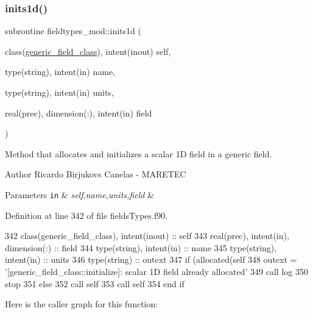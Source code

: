\subsubsection{\texorpdfstring{inits1d()}{inits1d()}}
{\footnotesize\ttfamily subroutine fieldtypes\+\_\+mod\+::inits1d (\begin{DoxyParamCaption}\item[{class(\mbox{\hyperlink{structfieldtypes__mod_1_1generic__field__class}{generic\+\_\+field\+\_\+class}}), intent(inout)}]{self,  }\item[{type(string), intent(in)}]{name,  }\item[{type(string), intent(in)}]{units,  }\item[{real(prec), dimension(\+:), intent(in)}]{field }\end{DoxyParamCaption})\hspace{0.3cm}{\ttfamily [private]}}



Method that allocates and initializes a scalar 1D field in a generic field. 

\begin{DoxyAuthor}{Author}
Ricardo Birjukovs Canelas -\/ M\+A\+R\+E\+T\+EC 
\end{DoxyAuthor}

\begin{DoxyParams}[1]{Parameters}
\mbox{\tt in}  & {\em self,name,units,field} & \\
\hline
\end{DoxyParams}


Definition at line 342 of file fields\+Types.\+f90.


\begin{DoxyCode}
342     \textcolor{keywordtype}{class}(generic\_field\_class), \textcolor{keywordtype}{intent(inout)} :: self
343     \textcolor{keywordtype}{real(prec)}, \textcolor{keywordtype}{intent(in)}, \textcolor{keywordtype}{dimension(:)} :: field
344     \textcolor{keywordtype}{type}(string), \textcolor{keywordtype}{intent(in)} :: name
345     \textcolor{keywordtype}{type}(string), \textcolor{keywordtype}{intent(in)} :: units
346     \textcolor{keywordtype}{type}(string) :: outext
347     \textcolor{keywordflow}{if} (\textcolor{keyword}{allocated}(self%
348         outext = \textcolor{stringliteral}{'[generic\_field\_class::initialize]: scalar 1D field already allocated'}
349         \textcolor{keyword}{call }log%
350         stop
351     \textcolor{keywordflow}{else}
352         \textcolor{keyword}{call }self%
353         \textcolor{keyword}{call }self%
354 \textcolor{keywordflow}{    end if}
\end{DoxyCode}
Here is the caller graph for this function\+:
\mbox{\label{namespacefieldtypes__mod_ad3329e97ec60bf9226d19be45ed21859}} 
